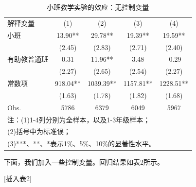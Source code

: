 \documentclass[cn,10pt,math=newtx,citestyle=gb7714-2015,bibstyle=gb7714-2015]{elegantbook}
\begin{document}
	\begin{center}
		\begin{table}[!h]
			\caption{小班教学实验的效应：无控制变量}\label{tab:digit}
			\begin{center}
				\begin{tabular}{lcccc}
					\hline
					解释变量&(1)&(2)&(3)&(4)\\
					\cline{1-5}
					小班&13.90**&29.78**&19.39**&19.59**\\
					&(2.45)&(2.83)&(2.71)&(2.40)\\
					
					有助教普通班&0.31&11.96**&3.48&-0.29\\
					&(2.27)&(2.65)&(2.54)&(2.27)\\
					
					常数项&918.04**&1039.39**&1157.81**&1228.51**\\
					&(1.63)&(1.78)&(1.82)&(1.68)\\
					
					\cline{1-5}
					Obs.&5786&6379&6049&5967\\
					
					\cline{1-5}
					\multicolumn{5}{l}{注：(1)1-4列分别为全样本，以及1-3年级样本；}\\
					\multicolumn{5}{l}{(2)括号中为标准误；}\\
					\multicolumn{5}{l}{(3)***、**、*表示1\%、5\%、10\%的显著性水平。}\\
					\hline
				\end{tabular}
			\end{center}
		\end{table}
	\end{center}
	
	下面，我们加入一些控制变量。回归结果如表2所示。
	\begin{center}
		[插入表2]
	\end{center}
	
\end{document}
